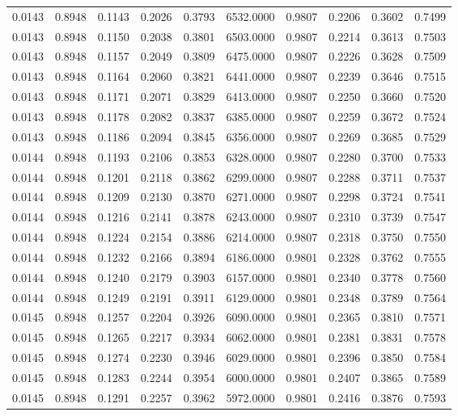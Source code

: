 \begin{tabular}{rrrrrrrrrr}
0.0143 & 0.8948 & 0.1143 & 0.2026 & 0.3793 & 6532.0000 & 0.9807 & 0.2206 & 0.3602 & 0.7499 \\
0.0143 & 0.8948 & 0.1150 & 0.2038 & 0.3801 & 6503.0000 & 0.9807 & 0.2214 & 0.3613 & 0.7503 \\
0.0143 & 0.8948 & 0.1157 & 0.2049 & 0.3809 & 6475.0000 & 0.9807 & 0.2226 & 0.3628 & 0.7509 \\
0.0143 & 0.8948 & 0.1164 & 0.2060 & 0.3821 & 6441.0000 & 0.9807 & 0.2239 & 0.3646 & 0.7515 \\
0.0143 & 0.8948 & 0.1171 & 0.2071 & 0.3829 & 6413.0000 & 0.9807 & 0.2250 & 0.3660 & 0.7520 \\
0.0143 & 0.8948 & 0.1178 & 0.2082 & 0.3837 & 6385.0000 & 0.9807 & 0.2259 & 0.3672 & 0.7524 \\
0.0143 & 0.8948 & 0.1186 & 0.2094 & 0.3845 & 6356.0000 & 0.9807 & 0.2269 & 0.3685 & 0.7529 \\
0.0144 & 0.8948 & 0.1193 & 0.2106 & 0.3853 & 6328.0000 & 0.9807 & 0.2280 & 0.3700 & 0.7533 \\
0.0144 & 0.8948 & 0.1201 & 0.2118 & 0.3862 & 6299.0000 & 0.9807 & 0.2288 & 0.3711 & 0.7537 \\
0.0144 & 0.8948 & 0.1209 & 0.2130 & 0.3870 & 6271.0000 & 0.9807 & 0.2298 & 0.3724 & 0.7541 \\
0.0144 & 0.8948 & 0.1216 & 0.2141 & 0.3878 & 6243.0000 & 0.9807 & 0.2310 & 0.3739 & 0.7547 \\
0.0144 & 0.8948 & 0.1224 & 0.2154 & 0.3886 & 6214.0000 & 0.9807 & 0.2318 & 0.3750 & 0.7550 \\
0.0144 & 0.8948 & 0.1232 & 0.2166 & 0.3894 & 6186.0000 & 0.9801 & 0.2328 & 0.3762 & 0.7555 \\
0.0144 & 0.8948 & 0.1240 & 0.2179 & 0.3903 & 6157.0000 & 0.9801 & 0.2340 & 0.3778 & 0.7560 \\
0.0144 & 0.8948 & 0.1249 & 0.2191 & 0.3911 & 6129.0000 & 0.9801 & 0.2348 & 0.3789 & 0.7564 \\
0.0145 & 0.8948 & 0.1257 & 0.2204 & 0.3926 & 6090.0000 & 0.9801 & 0.2365 & 0.3810 & 0.7571 \\
0.0145 & 0.8948 & 0.1265 & 0.2217 & 0.3934 & 6062.0000 & 0.9801 & 0.2381 & 0.3831 & 0.7578 \\
0.0145 & 0.8948 & 0.1274 & 0.2230 & 0.3946 & 6029.0000 & 0.9801 & 0.2396 & 0.3850 & 0.7584 \\
0.0145 & 0.8948 & 0.1283 & 0.2244 & 0.3954 & 6000.0000 & 0.9801 & 0.2407 & 0.3865 & 0.7589 \\
0.0145 & 0.8948 & 0.1291 & 0.2257 & 0.3962 & 5972.0000 & 0.9801 & 0.2416 & 0.3876 & 0.7593 \\

\end{tabular}
